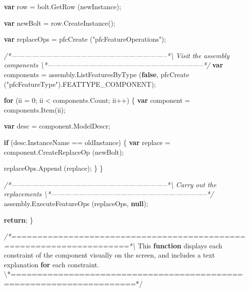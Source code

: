 \documentclass[]{article}
\newenvironment{Shaded}{}{}
\newcommand{\KeywordTok}[1]{\textcolor[rgb]{0.00,0.44,0.13}{\textbf{{#1}}}}
\newcommand{\DecValTok}[1]{\textcolor[rgb]{0.25,0.63,0.44}{{#1}}}
\newcommand{\StringTok}[1]{\textcolor[rgb]{0.25,0.44,0.63}{{#1}}}
\newcommand{\CommentTok}[1]{\textcolor[rgb]{0.38,0.63,0.69}{\textit{{#1}}}}
\newcommand{\OtherTok}[1]{\textcolor[rgb]{0.00,0.44,0.13}{{#1}}}
\newcommand{\FunctionTok}[1]{\textcolor[rgb]{0.02,0.16,0.49}{{#1}}}
\newcommand{\NormalTok}[1]{{#1}}
\begin{document}
\begin{Shaded}
\begin{Highlighting}[]
  \KeywordTok{var} \NormalTok{row = }\OtherTok{bolt}\NormalTok{.}\FunctionTok{GetRow} \NormalTok{(newInstance);  }
  
  \KeywordTok{var} \NormalTok{newBolt = }\OtherTok{row}\NormalTok{.}\FunctionTok{CreateInstance}\NormalTok{();}
  
  \KeywordTok{var} \NormalTok{replaceOps = }\FunctionTok{pfcCreate} \NormalTok{(}\StringTok{"pfcFeatureOperations"}\NormalTok{);}
 
 \CommentTok{/*--------------------------------------------------------------------*\textbackslash{} }
\CommentTok{   Visit the assembly components}
\CommentTok{ \textbackslash{}*--------------------------------------------------------------------*/}               
  \KeywordTok{var} \NormalTok{components = }\OtherTok{assembly}\NormalTok{.}\FunctionTok{ListFeaturesByType} \NormalTok{(}\KeywordTok{false}\NormalTok{,}
                        \FunctionTok{pfcCreate} \NormalTok{(}\StringTok{"pfcFeatureType"}\NormalTok{).}\FunctionTok{FEATTYPE_COMPONENT}\NormalTok{);}
  
  \KeywordTok{for} \NormalTok{(ii = }\DecValTok{0}\NormalTok{; ii < }\OtherTok{components}\NormalTok{.}\FunctionTok{Count}\NormalTok{; ii++)}
    \NormalTok{\{}
      \KeywordTok{var} \NormalTok{component = }\OtherTok{components}\NormalTok{.}\FunctionTok{Item}\NormalTok{(ii);}
      
      \KeywordTok{var} \NormalTok{desc = }\OtherTok{component}\NormalTok{.}\FunctionTok{ModelDescr}\NormalTok{;}
      
      \KeywordTok{if} \NormalTok{(}\OtherTok{desc}\NormalTok{.}\FunctionTok{InstanceName} \NormalTok{== oldInstance)}
    \NormalTok{\{}
      \KeywordTok{var} \NormalTok{replace = }\OtherTok{component}\NormalTok{.}\FunctionTok{CreateReplaceOp} \NormalTok{(newBolt);}
      
      \OtherTok{replaceOps}\NormalTok{.}\FunctionTok{Append} \NormalTok{(replace);}
    \NormalTok{\}}
    \NormalTok{\}}
  
 \CommentTok{/*--------------------------------------------------------------------*\textbackslash{} }
\CommentTok{   Carry out the replacements}
\CommentTok{ \textbackslash{}*--------------------------------------------------------------------*/}  
  \OtherTok{assembly}\NormalTok{.}\FunctionTok{ExecuteFeatureOps} \NormalTok{(replaceOps, }\KeywordTok{null}\NormalTok{);}
  
  \KeywordTok{return}\NormalTok{;}
\NormalTok{\}}


\CommentTok{/*=====================================================================*\textbackslash{}}
 \NormalTok{This }\KeywordTok{function} \NormalTok{displays each constraint of the component visually on }
 \NormalTok{the screen, and includes a text explanation }\KeywordTok{for} \NormalTok{each }\OtherTok{constraint}\NormalTok{.}
\NormalTok{\textbackslash{}*=====================================================================*}\OtherTok{/}


\end{Highlighting}
\end{Shaded}
\end{document}
